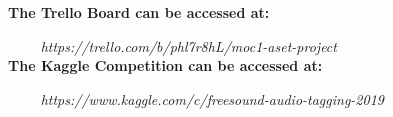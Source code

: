 \documentclass[11pt, a4papper]{report}
\theoremstyle{plain}
\theoremstyle{definition}
\theoremstyle{definition}
\theoremstyle{proposition}
\begin{document}
\textbf{\footnotemark The Trello Board can be accessed at:}

\ \ \ \ \hspace{2cm} \textit{https://trello.com/b/phl7r8hL/moc1-aset-project}
\\

\textbf{The Kaggle Competition can be accessed at: }

\ \ \ \ \hspace{2cm} \textit{https://www.kaggle.com/c/freesound-audio-tagging-2019}






\end{document}
